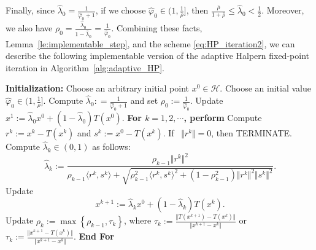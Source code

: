 \documentclass{article}
\theoremstyle{plain}
\theoremstyle{definition}
\newcommand{\norms}[1]{\Vert#1\Vert}
\newcommand{\iprods}[1]{\langle #1\rangle}
\newcommand{\0}{\boldsymbol{0}}
\begin{document}
Finally, since $\hat{\lambda}_0 = \frac{1}{\hat{\varphi}_0 + 1}$, if we choose $\hat{\varphi}_0 \in \big(1, \frac{1}{ \bar{\rho} } \big]$, then $\frac{\bar{\rho}}{1 + \bar{\rho}} \leq \hat{\lambda}_0 < \frac{1}{2}$.
Moreover, we also have $\rho_0 = \frac{\hat{\lambda}_0}{1-\hat{\lambda}_0} = \frac{1}{\hat{\varphi}_0}$.
Combining these facts, Lemma~\ref{le:implementable_step}, and the scheme \eqref{eq:HP_iteration2}, we can describe the following implementable version of the adaptive Halpern fixed-point iteration in Algorithm~\ref{alg:adaptive_HP}.

\begin{algorithm}[!htbp]
\caption{(Adaptive Halpern Fixed-Point Algorithm)}\label{alg:adaptive_HP}
\begin{algorithmic}[1]
\State\textbf{Initialization:} Choose an arbitrary initial point $x^0\in\mathcal H$.
\State\label{alg2:step2} Choose an initial value $\hat{\varphi}_0 \in \big(1, \frac{1}{ \bar{\rho} }\big]$.
Compute $\hat{\lambda}_0 : = \frac{1}{\hat{\varphi}_0 + 1}$ and set $\rho_0 := \frac{1}{\hat{\varphi}_0}$.
\State Update $x^1 :=  \hat{\lambda}_0x^0 + (1 - \hat{\lambda}_0) T(x^0)$.
\State \textbf{For $k = 1, 2, \cdots$, perform}
\State\hspace{3ex}Compute $r^k := x^k - T(x^k)$ and $s^k := x^0 - T(x^k)$.
\State\hspace{3ex}If ~$\norms{r^k} = 0$,  then TERMINATE.
\State\hspace{3ex}\label{alg2:step7}Compute $\hat{\lambda}_k \in (0, 1)$ as follows: 
\begin{equation*} 
\hat{\lambda}_k := \frac{\rho_{k-1}\norms{r^k}^2 }{ \rho_{k-1} \iprods{r^k, s^k} + \sqrt{\rho_{k-1}^2\iprods{r^k, s^k}^2 + (1 - \rho_{k-1}^2 )\norms{r^k}^2\norms{s^k}^2} }.
\end{equation*}	
\State\hspace{3ex}\label{alg2:step8}Update
\begin{equation*}
x^{k+1} :=  \hat{\lambda}_kx^0 + (1 - \hat{\lambda}_k) T(x^k).
\end{equation*}
\State\hspace{3ex}\label{alg2:step9}Update $\rho_{k} := \max\left\{ \rho_{k-1}, \tau_k \right\}$, where $\tau_k := \frac{\norms{T(x^{k+1}) - T(x^k)} }{ \norms{x^{k+1} - x^k} }$ or $\tau_k := \frac{\norms{x^{k+1} - T(x^k)} }{ \norms{x^{k+1} - x^k} }$.
\State\textbf{End For}
\end{algorithmic}
\end{algorithm}
\end{document}
